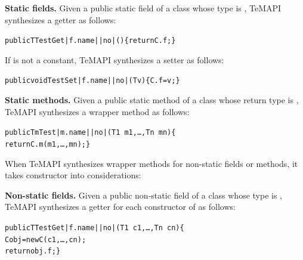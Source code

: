 \textbf{Static fields.} Given a public static field  of a class  whose type is , TeMAPI synthesizes a getter as follows:

\begin{CodeOut}\vspace*{-1ex}
\begin{alltt}
 public T TestGet|f.name||no|()\{ return C.f; \}
\end{alltt}
\end{CodeOut}\vspace*{-1ex}

If  is not a constant, TeMAPI synthesizes a setter as follows:

\begin{CodeOut}\vspace*{-1ex}
\begin{alltt}
 public void TestSet|f.name||no|(T v)\{ C.f = v; \}
\end{alltt}
\end{CodeOut}\vspace*{-1ex}

\textbf{Static methods.} Given a public static method  of a class  whose return type is , TeMAPI synthesizes a wrapper method as follows:

\begin{CodeOut}\vspace*{-1ex}
\begin{alltt}
 public Tm Test|m.name||no|(T1\ m1,\ldots, Tn\ mn)\{
   return C.m(m1,\ldots, mn); \}
\end{alltt}
\end{CodeOut}\vspace*{-1ex}

When TeMAPI synthesizes wrapper methods for non-static fields or methods, it takes constructor into considerations:

\textbf{Non-static fields.} Given a public non-static field  of a class  whose type is , TeMAPI synthesizes a getter for each constructor  of  as follows:

\begin{CodeOut}\vspace*{-1ex}
\begin{alltt}
 public T TestGet|f.name||no|(T1\ c1,\ldots, Tn\ cn)\{
    C obj = new C(c1,\ldots, cn);
    return obj.f; \}
\end{alltt}
\end{CodeOut}\vspace*{-1ex}

